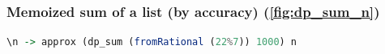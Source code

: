 \subsubsection{Memoized sum of a list (by accuracy) (\cref{fig:dp_sum_n})}
\begin{lstlisting}[language=Haskell]
\n -> approx (dp_sum (fromRational (22%7)) 1000) n
\end{lstlisting}










